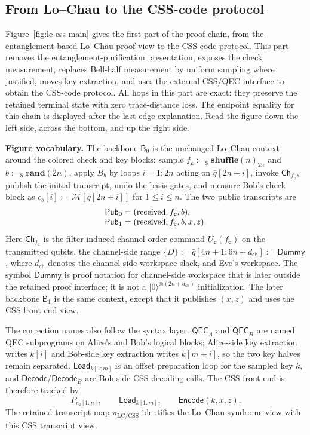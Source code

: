 \documentclass[conference,compsoc]{IEEEtran}
\begin{document}
\subsection{From Lo--Chau to the CSS-code protocol}

Figure~\ref{fig:lc-css-main} gives the first part of the proof chain, from the
entanglement-based Lo--Chau proof view to the CSS-code protocol. This part
removes the entanglement-purification presentation, exposes the check
measurement, replaces Bell-half measurement by uniform sampling where justified,
moves key extraction, and uses the external CSS/QEC interface to obtain the
CSS-code protocol. All hops in this part are exact: they preserve the retained
terminal state with zero trace-distance loss. The endpoint equality for this
chain is displayed after the last edge explanation. Read the figure down the
left side, across the bottom, and up the right side.

\smallskip\noindent\textbf{Figure vocabulary.}
The backbone $\mathsf{B}_0$ is the unchanged Lo--Chau context around the colored check and key blocks: sample \(f_{\mathbf c}:=_\$\mathbf{shuffle}(n)_{2n}\) and \(b:=_\$\mathbf{rand}(2n)\), apply \(B_b\) by loops \(i=1{:}2n\) acting on \(\bar q[2n+i]\), invoke \(\mathsf{Ch}_{f_{\mathbf c}}\), publish the initial transcript, undo the basis gates, and measure Bob's check block as \(c_b[i]:=\mathcal M[\bar q[2n+i]]\) for \(1\le i\le n\). The two public transcripts are
\[
\begin{array}{@{}l@{}}
\mathsf{Pub}_0=(\mathrm{received},f_{\mathbf c},b),\\
\mathsf{Pub}_1=(\mathrm{received},f_{\mathbf c},b,x,z).
\end{array}
\]
Here $\mathsf{Ch}_{f_{\mathbf c}}$ is the filter-induced channel-order command \(U_{\mathbf c}(f_{\mathbf c})\) on the transmitted qubits, the channel-side range \(\{D\}:=\bar q[4n+1{:}6n+d_{\mathsf{ch}}]:=\mathsf{Dummy}\), where \(d_{\mathsf{ch}}\) denotes the channel-side workspace slack, and Eve's workspace. The symbol \(\mathsf{Dummy}\) is proof notation for channel-side workspace that is later outside the retained proof interface; it is not a \(|0\rangle^{\otimes(2n+d_{\mathsf{ch}})}\) initialization. The later backbone \(\mathsf{B}_1\) is the same context, except that it publishes \((x,z)\) and uses the CSS front-end view.

The correction names also follow the syntax layer. $\mathsf{QEC}_A$ and $\mathsf{QEC}_B$ are named QEC subprograms on Alice's and Bob's logical blocks; Alice-side key extraction writes \(k[i]\) and Bob-side key extraction writes \(k[m+i]\), so the two key halves remain separated. $\mathsf{Load}_{k[1{:}m]}$ is an offset preparation loop for the sampled key $k$, and $\mathsf{Decode}$/$\mathsf{Decode}_B$ are Bob-side CSS decoding calls. The CSS front end is therefore tracked by
\[
P_{c_a[1{:}n]},
\qquad
\mathsf{Load}_{k[1{:}m]},
\qquad
\mathsf{Encode}(k,x,z).
\]
The retained-transcript map $\pi_{\mathrm{LC/CSS}}$ identifies the Lo--Chau syndrome view with this CSS transcript view.
\end{document}
